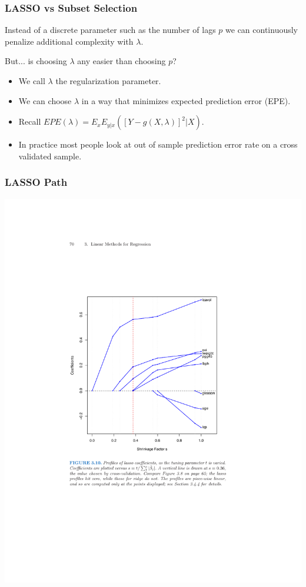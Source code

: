 \begin{frame}
\frametitle{LASSO vs Subset Selection}

Instead of a discrete parameter such as the number of lags $p$ we can continuously penalize additional complexity with $\lambda$. 

But... is choosing $\lambda$ any easier than choosing $p$?
\begin{itemize}
\item We call $\lambda$ the \alert{regularization} parameter.
\item We can choose $\lambda$ in a way that minimizes expected prediction error (EPE).
\item Recall $EPE(\lambda) = E_x E_{y|x} ([ Y- g(X,\lambda)]^2 | X)$.
\item In practice most people look at out of sample prediction error rate on a \alert{cross validated sample}.
\end{itemize}
\end{frame}

\begin{frame}
\frametitle{LASSO Path}
\vspace{-25pt}
\begin{center}
\includegraphics[width=.85\textwidth]{./resources/lassopath}
\end{center}
\end{frame}

